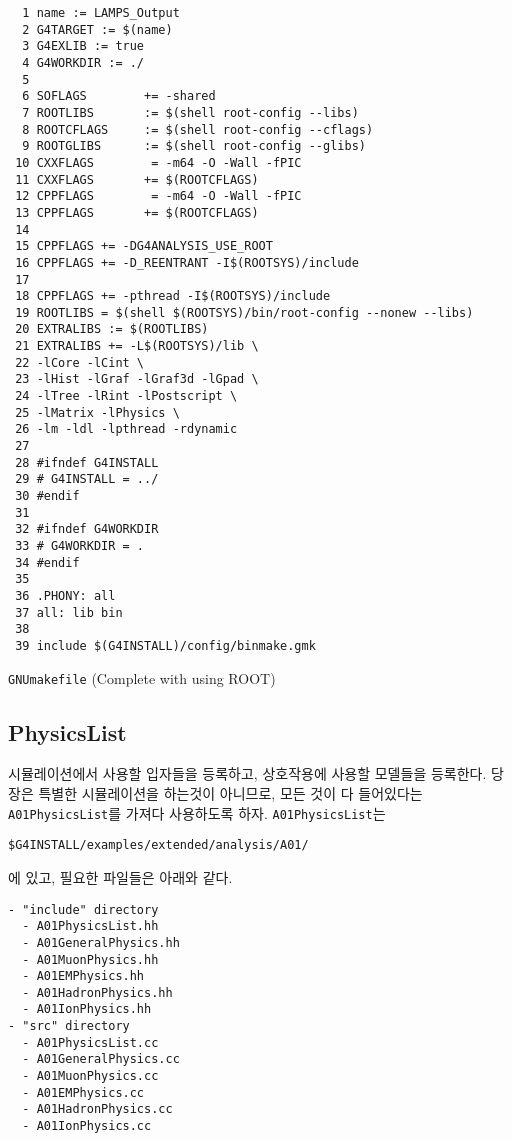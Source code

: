 \begin{code}[h]
\begin{lstlisting}
  1 name := LAMPS_Output
  2 G4TARGET := $(name)
  3 G4EXLIB := true
  4 G4WORKDIR := ./
  5 
  6 SOFLAGS        += -shared
  7 ROOTLIBS       := $(shell root-config --libs)
  8 ROOTCFLAGS     := $(shell root-config --cflags)
  9 ROOTGLIBS      := $(shell root-config --glibs)
 10 CXXFLAGS        = -m64 -O -Wall -fPIC 
 11 CXXFLAGS       += $(ROOTCFLAGS) 
 12 CPPFLAGS        = -m64 -O -Wall -fPIC
 13 CPPFLAGS       += $(ROOTCFLAGS) 
 14 
 15 CPPFLAGS += -DG4ANALYSIS_USE_ROOT
 16 CPPFLAGS += -D_REENTRANT -I$(ROOTSYS)/include
 17 
 18 CPPFLAGS += -pthread -I$(ROOTSYS)/include
 19 ROOTLIBS = $(shell $(ROOTSYS)/bin/root-config --nonew --libs)
 20 EXTRALIBS := $(ROOTLIBS)
 21 EXTRALIBS += -L$(ROOTSYS)/lib \
 22 -lCore -lCint \
 23 -lHist -lGraf -lGraf3d -lGpad \
 24 -lTree -lRint -lPostscript \
 25 -lMatrix -lPhysics \
 26 -lm -ldl -lpthread -rdynamic
 27 
 28 #ifndef G4INSTALL
 29 # G4INSTALL = ../
 30 #endif
 31 
 32 #ifndef G4WORKDIR
 33 # G4WORKDIR = .
 34 #endif
 35 
 36 .PHONY: all
 37 all: lib bin
 38 
 39 include $(G4INSTALL)/config/binmake.gmk
\end{lstlisting}
\caption{\texttt{GNUmakefile} (Complete with using ROOT) \label{code-3-1-5}}
\end{code}

\newpage
\subsection{PhysicsList}
시뮬레이션에서 사용할 입자들을 등록하고, 상호작용에 사용할 모델들을 등록한다.
당장은 특별한 시뮬레이션을 하는것이 아니므로, 모든 것이 다 들어있다는
\texttt{A01PhysicsList}를 가져다 사용하도록 하자. \texttt{A01PhysicsList}는
\begin{pc}
\begin{lstlisting}
$G4INSTALL/examples/extended/analysis/A01/
\end{lstlisting}
\end{pc}
에 있고, 필요한 파일들은 아래와 같다.

\begin{verbatim}
- "include" directory
  - A01PhysicsList.hh
  - A01GeneralPhysics.hh
  - A01MuonPhysics.hh
  - A01EMPhysics.hh
  - A01HadronPhysics.hh
  - A01IonPhysics.hh
- "src" directory
  - A01PhysicsList.cc
  - A01GeneralPhysics.cc
  - A01MuonPhysics.cc
  - A01EMPhysics.cc
  - A01HadronPhysics.cc
  - A01IonPhysics.cc
\end{verbatim}

